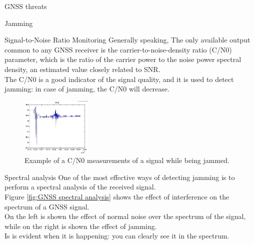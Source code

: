 \begin{section}{GNSS threats}
\begin{subsection}{Jamming}
\begin{subsubsection}{Signal-to-Noise Ratio Monitoring}
          Generally speaking, The only available output common to any GNSS receiver is the 
          carrier-to-noise-density ratio (C/N0) parameter, which is the ratio of the carrier power
          to the noise power spectral density, an estimated value closely related to SNR.\\
          The C/N0 is a good indicator of the signal quality, and it is used to detect jamming: in
          case of jamming, the C/N0 will decrease.\\
          \begin{figure}[h]
            \centering
            \includegraphics[width=0.3\textwidth]{img/wireless/c over n0.png}
            \caption{Example of a C/N0 measurements of a signal while being jammed.}
            \label{fig:GNSS CN0 monitoring}
          \end{figure}

        \end{subsubsection}
        \begin{subsubsection}{Spectral analysis}
          One of the most effective ways of detecting jamming is to perform a spectral analysis of the
          received signal.\\

          Figure \ref{fig:GNSS spectral analysis} shows the effect of interference on the spectrum
          of a GNSS signal.\\
          On the left is shown the effect of normal noise over the spectrum of the signal, while on
          the right is shown the effect of jamming.\\
          Is is evident when it is happening: you can clearly see it in the spectrum.\\


\end{subsubsection}
\end{subsection}
\end{section}

